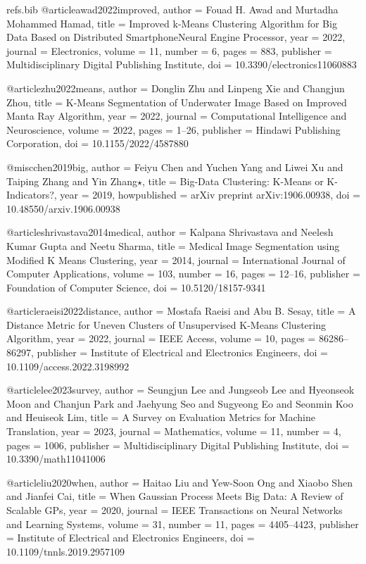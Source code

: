 \begin{filecontents*}[overwrite]{refs.bib}
@article{awad2022improved,
  author = {Fouad H. Awad and Murtadha Mohammed Hamad},
  title = {{Improved k-Means Clustering Algorithm for Big Data Based on Distributed SmartphoneNeural Engine Processor}},
  year = {2022},
  journal = {Electronics},
  volume = {11},
  number = {6},
  pages = {883},
  publisher = {Multidisciplinary Digital Publishing Institute},
  doi = {10.3390/electronics11060883}
}

@article{zhu2022means,
  author = {Donglin Zhu and Linpeng Xie and Changjun Zhou},
  title = {{K-Means Segmentation of Underwater Image Based on Improved Manta Ray Algorithm}},
  year = {2022},
  journal = {Computational Intelligence and Neuroscience},
  volume = {2022},
  pages = {1--26},
  publisher = {Hindawi Publishing Corporation},
  doi = {10.1155/2022/4587880}
}

@misc{chen2019big,
  author = {Feiyu Chen and Yuchen Yang and Liwei Xu and Taiping Zhang and Yin Zhang{\ensuremath{\star}}},
  title = {{Big-Data Clustering: K-Means or K-Indicators?}},
  year = {2019},
  howpublished = {arXiv preprint arXiv:1906.00938},
  doi = {10.48550/arxiv.1906.00938}
}

@article{shrivastava2014medical,
  author = {Kalpana Shrivastava and Neelesh Kumar Gupta and Neetu Sharma},
  title = {{Medical Image Segmentation using Modified K Means Clustering}},
  year = {2014},
  journal = {International Journal of Computer Applications},
  volume = {103},
  number = {16},
  pages = {12--16},
  publisher = {Foundation of Computer Science},
  doi = {10.5120/18157-9341}
}

@article{raeisi2022distance,
  author = {Mostafa Raeisi and Abu B. Sesay},
  title = {{A Distance Metric for Uneven Clusters of Unsupervised K-Means Clustering Algorithm}},
  year = {2022},
  journal = {IEEE Access},
  volume = {10},
  pages = {86286--86297},
  publisher = {Institute of Electrical and Electronics Engineers},
  doi = {10.1109/access.2022.3198992}
}

@article{lee2023survey,
  author = {Seungjun Lee and Jungseob Lee and Hyeonseok Moon and Chanjun Park and Jaehyung Seo and Sugyeong Eo and Seonmin Koo and Heuiseok Lim},
  title = {{A Survey on Evaluation Metrics for Machine Translation}},
  year = {2023},
  journal = {Mathematics},
  volume = {11},
  number = {4},
  pages = {1006},
  publisher = {Multidisciplinary Digital Publishing Institute},
  doi = {10.3390/math11041006}
}

@article{liu2020when,
  author = {Haitao Liu and Yew-Soon Ong and Xiaobo Shen and Jianfei Cai},
  title = {{When Gaussian Process Meets Big Data: A Review of Scalable GPs}},
  year = {2020},
  journal = {IEEE Transactions on Neural Networks and Learning Systems},
  volume = {31},
  number = {11},
  pages = {4405--4423},
  publisher = {Institute of Electrical and Electronics Engineers},
  doi = {10.1109/tnnls.2019.2957109}
}


\end{filecontents*}
